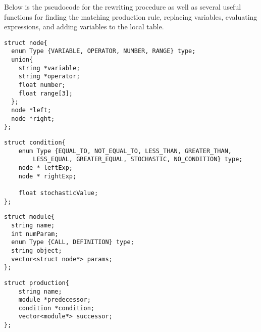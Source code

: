 Below is the pseudocode for the rewriting procedure as well as several useful functions for finding the matching production rule, replacing variables, evaluating expressions, and adding variables to the local table. 

\begin{singlespace}
\newpage

\lstset{language=C}
\lstset{morekeywords=string}

\begin{lstlisting}[frame=single] 
struct node{
  enum Type {VARIABLE, OPERATOR, NUMBER, RANGE} type;
  union{
  	string *variable; 
  	string *operator; 
  	float number;
  	float range[3];
  };
  node *left; 
  node *right; 
};
\end{lstlisting}

\lstset{morekeywords=vector}
\lstset{morekeywords=node}

\begin{lstlisting}[frame=single] 
struct condition{
    enum Type {EQUAL_TO, NOT_EQUAL_TO, LESS_THAN, GREATER_THAN, 
    	LESS_EQUAL, GREATER_EQUAL, STOCHASTIC, NO_CONDITION} type;
    node * leftExp;
    node * rightExp;

    float stochasticValue;
};
\end{lstlisting}

\lstset{morekeywords=condition}

\begin{lstlisting}[frame=single] 
struct module{
  string name;
  int numParam; 
  enum Type {CALL, DEFINITION} type;
  string object; 
  vector<struct node*> params;
};
\end{lstlisting}

\lstset{morekeywords=module}

\begin{lstlisting}[frame=single] 
struct production{
    string name;
    module *predecessor;
    condition *condition;
    vector<module*> successor;
};
\end{lstlisting}


\end{singlespace}
